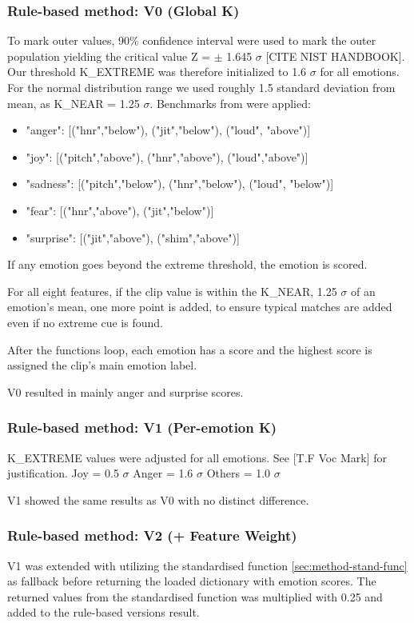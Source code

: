 \subsubsection{Rule-based method: V0 (Global K)}

To mark outer values, 90\% confidence interval were used to mark the outer population \autocite{Bruce2017} yielding the critical value Z = $\pm$ 1.645 $\sigma$ [CITE NIST HANDBOOK]. 
Our threshold K\_EXTREME was therefore initialized to 1.6 $\sigma$ for all emotions. For the normal distribution range we used roughly 1.5 standard deviation from mean, as K\_NEAR = 1.25 $\sigma$. 
Benchmarks from \textcite{Ekberg2023} were applied: 
\begin{itemize}
    \item "anger": [("hnr","below"), ("jit","below"), ("loud", "above")]
    \item "joy": [("pitch","above"), ("hnr","above"), ("loud","above")]
    \item "sadness": [("pitch","below"), ("hnr","below"), ("loud", "below")]
    \item "fear": [("hnr","above"), ("jit","below")]
    \item "surprise": [("jit","above"), ("shim","above")]
\end{itemize}
If any emotion goes beyond the extreme threshold, the emotion is scored. 

For all eight features, if the clip value is within the K\_NEAR, 1.25 $\sigma$ of an emotion's mean, one more point is added, to ensure typical matches are added even if no extreme cue is found. 

After the functions loop, each emotion has a score and the highest score is assigned the clip's main emotion label. 

V0 resulted in mainly anger and surprise scores. 
\subsubsection{Rule-based method: V1 (Per-emotion K)}
K\_EXTREME values were adjusted for all emotions. See [T.F Voc Mark] for justification. 
Joy = 0.5 $\sigma$ 
Anger = 1.6 $\sigma$ 
Others = 1.0 $\sigma$

\medskip
V1 showed the same results as V0 with no distinct difference. 

\subsubsection{Rule-based method: V2 (+ Feature Weight)}
V1 was extended with utilizing the standardised function \ref{sec:method-stand-func} as fallback before returning the loaded dictionary with emotion scores. 
The returned values from the standardised function was multiplied with 0.25 and added to the rule-based versions result.

